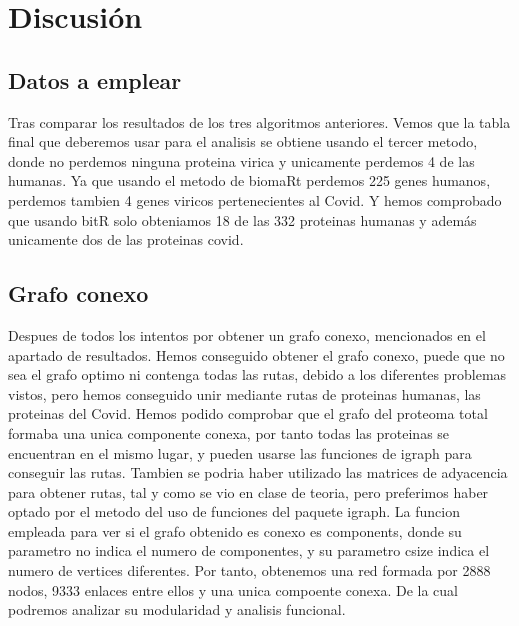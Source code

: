 \section{Discusión}

\subsection{Datos a emplear}
Tras comparar los resultados de los tres algoritmos anteriores. Vemos que la tabla final que deberemos usar para el analisis se obtiene usando el tercer metodo, donde no perdemos ninguna proteina virica y unicamente perdemos 4 de las humanas. 
Ya que usando el metodo de biomaRt perdemos 225 genes humanos, perdemos tambien 4 genes viricos pertenecientes al Covid. Y hemos comprobado que usando bitR solo obteniamos 18 de las 332 proteinas humanas y además unicamente dos de las proteinas covid. 

\subsection{Grafo conexo}
Despues de todos los intentos por obtener un grafo conexo, mencionados en el apartado de resultados. Hemos conseguido obtener el grafo conexo, puede que no sea el grafo optimo ni contenga todas las rutas, debido a los diferentes problemas vistos, pero hemos conseguido unir mediante rutas de proteinas humanas, las proteinas del Covid. 
Hemos podido comprobar que el grafo del proteoma total formaba una unica componente conexa, por tanto todas las proteinas se encuentran en el mismo lugar, y pueden usarse las funciones de igraph para conseguir las rutas. 
Tambien se podria haber utilizado las matrices de adyacencia para obtener rutas, tal y como se vio en clase de teoria, pero preferimos haber optado por el metodo del uso de funciones del paquete igraph. La funcion empleada para ver si el grafo obtenido es conexo es components, donde su parametro no indica el numero de componentes, y su parametro csize indica el numero de vertices diferentes. 
Por tanto, obtenemos una red formada por 2888 nodos, 9333 enlaces entre ellos y una unica compoente conexa. De la cual podremos analizar su modularidad y analisis funcional.

